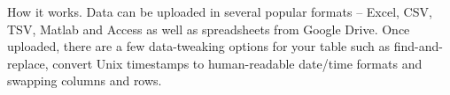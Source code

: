How it works. Data can be uploaded in several popular formats -- Excel, CSV, TSV, Matlab and Access as well as spreadsheets from Google Drive. Once uploaded, there are a few data-tweaking options for your table such as find-and-replace, convert Unix timestamps to human-readable date/time formats and swapping columns and rows.

